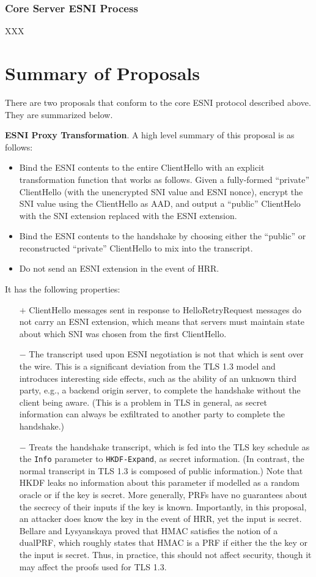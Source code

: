 \documentclass[twoside]{article}
\theoremstyle{definition}
\begin{document}
\subsubsection{Core Server ESNI Process}
XXX

\section{Summary of Proposals}

There are two proposals that conform to the core ESNI protocol described above. They are
summarized below.

\textbf{ESNI Proxy Transformation}. A high level summary of this proposal is as follows:
%
\begin{itemize}
  \item Bind the ESNI contents to the entire ClientHello with an explicit transformation function
  that works as follows. Given a fully-formed ``private'' ClientHello (with the unencrypted SNI 
  value and ESNI nonce), encrypt the SNI value using the ClientHello as AAD, and output a ``public'' 
  ClientHelo with the SNI extension replaced with the ESNI extension. 
  \item Bind the ESNI contents to the handshake by choosing either the ``public'' or reconstructed
  ``private'' ClientHello to mix into the transcript. 
  \item Do not send an ESNI extension in the event of HRR.
\end{itemize}
%
It has the following properties:
%
\begin{itemize}
  \item[$+$] ClientHello messages sent in response to HelloRetryRequest messages do not carry an ESNI
  extension, which means that servers must maintain state about which SNI was chosen from the first ClientHello.
  \item[$-$] The transcript used upon ESNI negotiation is not that which is sent over the wire. This is
  a significant deviation from the TLS 1.3 model and introduces interesting side effects, such as the
  ability of an unknown third party, e.g., a backend origin server, to complete the handshake without
  the client being aware. (This is a problem in TLS in general, as secret information can always be
  exfiltrated to another party to complete the handshake.)
  \item[$-$] Treats the handshake transcript, which is fed into the TLS key schedule as the {\tt Info}
  parameter to {\tt HKDF-Expand}, as secret information. (In contrast, the normal transcript in TLS 1.3
  is composed of public information.) Note that HKDF leaks no information about this parameter
  if modelled as a random oracle or if the key is secret. More generally, PRFs have no guarantees about
  the secrecy of their inputs if the key is known. Importantly, in this proposal, an attacker
  does know the key in the event of HRR, yet the input is secret. Bellare and Lysyanskaya \cite{bellare2015symmetric}
  proved that HMAC satisfies the notion of a dualPRF, which roughly states that HMAC is a PRF if 
  either the the key or the input is secret. Thus, in practice, this should not affect security, though
  it may affect the proofs used for TLS 1.3.
\end{itemize}
%
\end{document}
